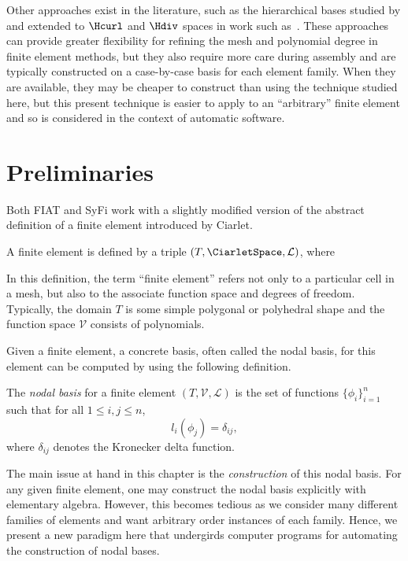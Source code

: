 Other approaches exist in the literature, such as the hierarchical
bases studied by \citet{SzaboBabuska1991}
and extended to $\Hcurl$ and $\Hdiv$ spaces in work such
as~\citet{AinsworthCoyle2003}.  These approaches can provide greater
flexibility for refining the mesh and polynomial degree in finite
element methods, but they also require more care during assembly and are
typically constructed on a case-by-case basis for each element family.
When they are available, they may be cheaper to construct than using the
technique studied here, but this present technique is easier to apply
to an ``arbitrary'' finite element and so is considered in the context
of automatic software.

\section{Preliminaries}

Both FIAT and SyFi work with a slightly modified version of the abstract
definition of a finite element introduced by Ciarlet.
\begin{definition}
  A finite element is defined by a triple
  $(T, \CiarletSpace,\mathcal{L})$, where
  \femdefinition{}
  \label{chap:kirby-1:fedef}
\end{definition}
In this definition, the term ``finite element'' refers not only to a
particular cell in a mesh, but also to the associate function space
and degrees of freedom.  Typically, the domain $T$ is some simple
polygonal or polyhedral shape and the function space $\mathcal{V}$
consists of polynomials.

Given a finite element, a concrete basis, often called the nodal basis,
for this element can be computed by using the following definition.
%
\begin{definition}
The \emph{nodal basis} for a finite element $(T,\mathcal{V},\mathcal{L})$
is the set of functions $\{ \phi_i \}_{i=1}^{n}$ such
that for all $1 \leqslant i,j \leqslant n$,
\begin{equation}
l_i(\phi_j) = \delta_{ij},
\end{equation}
where $\delta_{ij}$ denotes the Kronecker delta function.
\label{chap:kirby-1:nodaldef}
\end{definition}

The main issue at hand in this chapter is the \emph{construction} of this
nodal basis.  For any given finite element, one may construct the nodal
basis explicitly with elementary algebra.  However, this becomes tedious
as we consider many different families of elements and want arbitrary
order instances of each family.  Hence, we present a new paradigm here
that undergirds computer programs for automating the construction of
nodal bases.


